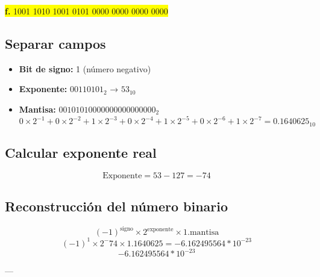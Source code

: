 \documentclass[a4paper,12pt]{article}
\begin{document}
	\begin{center}
		\colorbox{yellow}{\textbf{f.} 1001 1010 1001 0101 0000 0000 0000 0000}
		
		\subsection*{Separar campos}
		
		\begin{itemize}
			\item \textbf{Bit de signo:} 1 (número negativo)
			\item \textbf{Exponente:} $00110101_2$ → $53_{10}$
			\item \textbf{Mantisa:} $00101010000000000000000_2$ 
			\[
			0\times2^{-1} + 0\times2^{-2} + 1\times2^{-3} + 0\times2^{-4} + 1\times2^{-5} + 0\times2^{-6} + 1\times2^{-7} = 0.1640625_{10}
			\]
		\end{itemize}
		
		\subsection*{Calcular exponente real}
		
		\[
		\text{Exponente} = 53 - 127 = -74
		\]
		
		
		
		\subsection*{Reconstrucción del número binario}	
		\[
		(-1)^{\text{signo}} \times 2^{\text{exponente}} \times 1.\text{mantisa}
		\]
		\[
		(-1)^1 \times 2^-74 \times 1.1640625 = -6.162495564*10^{-23}
		\]
		\vspace{1em}
		\[
		\boxed{-6.162495564*10^{-23}}
		\]
		
		---
	\end{center}
\end{document}
